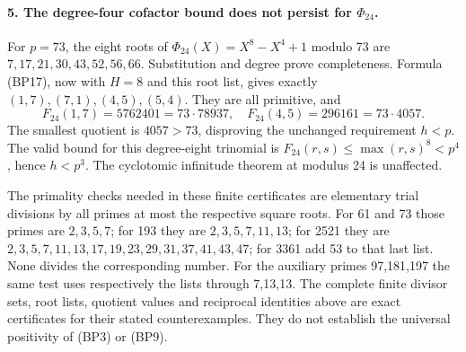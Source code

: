 \paragraph{5. The degree-four cofactor bound does not persist for
\(\Phi_{24}\).}
For \(p=73\), the eight roots of \(\Phi_{24}(X)=X^8-X^4+1\)
modulo 73 are \(7,17,21,30,43,52,56,66\). Substitution and degree
prove completeness. Formula (BP17), now with \(H=8\) and this root
list, gives exactly
\((1,7),(7,1),(4,5),(5,4)\). They are all primitive, and
\[
 F_{24}(1,7)=5762401=73\cdot78937,\quad
 F_{24}(4,5)=296161=73\cdot4057.
\]
The smallest quotient is \(4057>73\), disproving the unchanged
requirement \(h<p\). The valid bound for this degree-eight trinomial
is \(F_{24}(r,s)\le\max(r,s)^8<p^4\), hence \(h<p^3\).
The cyclotomic infinitude theorem at modulus 24 is unaffected.

The primality checks needed in these finite certificates are elementary
trial divisions by all primes at most the respective square roots.
For 61 and 73 those primes are \(2,3,5,7\); for 193 they are
\(2,3,5,7,11,13\); for 2521 they are
\(2,3,5,7,11,13,17,19,23,29,31,37,41,43,47\); for 3361
add 53 to that last list. None divides the corresponding number.
For the auxiliary primes 97,181,197 the same test uses respectively
the lists through 7,13,13. The complete finite divisor sets, root
lists, quotient values and reciprocal identities above are exact
certificates for their stated counterexamples. They do not establish
the universal positivity of (BP3) or (BP9).
